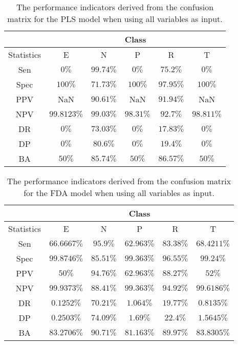 \begin{table}[!ht]
	\centering
	\begin{tabular}{|c|c|c|c|c|c|}
		\hline
		 & \multicolumn{5}{c|}{Class} \\ \hline
		Statistics & E & N & P & R & T \\ \hline
		Sen & $0\%$ & $99.74\%$ & $0\%$ & $75.2\%$ & $0\%$ \\ \hline
		Spec & $100\%$ & $71.73\%$ & $100\%$ & $97.95\%$ & $100\%$ \\ \hline
		PPV & NaN & $90.61\%$ & NaN & $91.94\%$ & NaN \\ \hline
		NPV & $99.8123\%$ & $99.03\%$ & $98.31\%$ & $92.7\%$ & $98.811\%$ \\ \hline
		DR & $0\%$ & $73.03\%$ & $0\%$ & $17.83\%$ & $0\%$ \\ \hline
		DP & $0\%$ & $80.6\%$ & $0\%$ & $19.4\%$ & $0\%$ \\ \hline
		BA & $50\%$ & $85.74\%$ & $50\%$ & $86.57\%$ & $50\%$ \\ \hline
	\end{tabular}
	\caption{The performance indicators derived from the confusion matrix for the PLS model when using all variables as input.}
	\label{tab:cs:reverse:all:pls}
\end{table}

\begin{table}[!ht]
	\centering
	\begin{tabular}{|c|c|c|c|c|c|}
		\hline
		 & \multicolumn{5}{c|}{Class} \\ \hline
		Statistics & E & N & P & R & T \\ \hline
		Sen & $66.6667\%$ & $95.9\%$ & $62.963\%$ & $83.38\%$ & $68.4211\%$ \\ \hline
		Spec & $99.8746\%$ & $85.51\%$ & $99.363\%$ & $96.55\%$ & $99.24\%$ \\ \hline
		PPV & $50\%$ & $94.76\%$ & $62.963\%$ & $88.27\%$ & $52\%$ \\ \hline
		NPV & $99.9373\%$ & $88.41\%$ & $99.363\%$ & $94.92\%$ & $99.6186\%$ \\ \hline
		DR & $0.1252\%$ & $70.21\%$ & $1.064\%$ & $19.77\%$ & $0.8135\%$ \\ \hline
		DP & $0.2503\%$ & $74.09\%$ & $1.69\%$ & $22.4\%$ & $1.5645\%$ \\ \hline
		BA & $83.2706\%$ & $90.71\%$ & $81.163\%$ & $89.97\%$ & $83.8305\%$ \\ \hline
	\end{tabular}
	\caption{The performance indicators derived from the confusion matrix for the FDA model when using all variables as input.}
	\label{tab:cs:reverse:all:fda}
\end{table}

